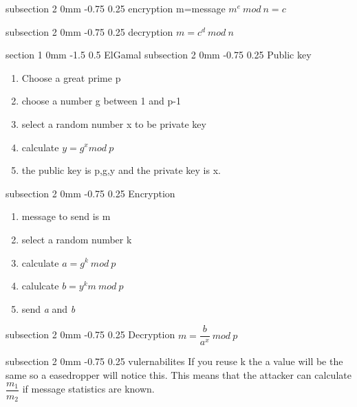 \documentclass[a4paper,11pt]{article}
\makeatletter
\renewcommand{\section}{\@startsection
   {section}%
   {1}%
   {0mm}%
   {-1.5\baselineskip}%
   {0.5\baselineskip}%
   {\sffamily\bfseries\upshape\normalsize}}%
\renewcommand{\subsection}{\@startsection
   {subsection}%
   {2}%
   {0mm}%
   {-0.75\baselineskip}%
   {0.25\baselineskip}%
   {\rmfamily\normalfont\slshape\normalsize}}%
\makeatother
\begin{document}
\subsection{encryption}
m=message
$m^e \ mod \ n=c$

\subsection{decryption}
$m=c^d \ mod \ n$


\section{ElGamal}
\subsection{Public key}
\begin{enumerate}
\item Choose a great prime p
\item choose a number g between 1 and p-1
\item select a random number x to be private key
\item calculate $y=g^x mod \ p$
\item the public key is p,g,y and the private key is x.
\end{enumerate}

\subsection{Encryption}
\begin{enumerate}
\item message to send is m
\item select a random number k
\item calculate $a=g^k\ mod \ p$
\item calulcate $b=y^km \ mod \ p$
\item send \textit{a} and \textit{b}
\end{enumerate}

\subsection{Decryption}
$m=\dfrac{b}{a^x}\ mod \ p$

\subsection{vulernabilites}
If you reuse k the a value will be the same so a easedropper will notice this. This means that the attacker can calculate $\dfrac{m_1}{m_2}$ if message statistics are known. 
\end{document}
